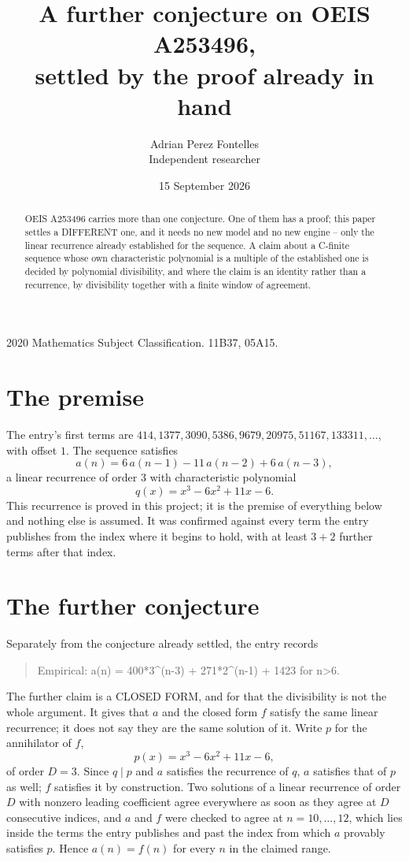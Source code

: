 \documentclass[11pt,a4paper]{article}
\title{A further conjecture on OEIS A253496,\\ \large settled by the proof already in hand}
\author{Adrian Perez Fontelles\\ \small Independent researcher}
\date{15 September 2026}
\theoremstyle{plain}
\theoremstyle{definition}
\begin{document}
\maketitle

\begin{abstract}
OEIS A253496 carries more than one conjecture. One of them has a proof; this paper settles a
DIFFERENT one, and it needs no new model and no new engine -- only the linear recurrence already
established for the sequence. A claim about a C-finite sequence whose own characteristic
polynomial is a multiple of the established one is decided by polynomial divisibility, and where
the claim is an identity rather than a recurrence, by divisibility together with a finite window
of agreement.
\end{abstract}

\noindent\small 2020 Mathematics Subject Classification. 11B37, 05A15.\normalsize

\section{The premise}

The entry's first terms are $414, 1377, 3090, 5386, 9679, 20975, 51167, 133311,\dots$, with offset $1$. The sequence satisfies
\[
  a(n)=6\,a(n-1) - 11\,a(n-2) + 6\,a(n-3) ,
\]
a linear recurrence of order $3$ with characteristic polynomial
\[
  q(x)=x^{3} - 6 x^{2} + 11 x - 6 .
\]
This recurrence is proved in this project; it is the premise of everything below and nothing else is assumed.
It was confirmed against every term the entry publishes from the index where it begins to hold,
with at least $3+2$ further terms after that index.

\section{The further conjecture}

Separately from the conjecture already settled, the entry records

\begin{quote}\raggedright Empirical: a(n) = 400*3\^{}(n-3) + 271*2\^{}(n-1) + 1423 for n>6.\end{quote}

The further claim is a CLOSED FORM, and for that the divisibility is not the whole argument. It
gives that $a$ and the closed form $f$ satisfy the same linear recurrence; it does not say they
are the same solution of it. Write $p$ for the annihilator of $f$,
\[
  p(x)=x^{3} - 6 x^{2} + 11 x - 6 ,
\]
of order $D=3$. Since $q\mid p$ and $a$ satisfies the recurrence of $q$, $a$ satisfies that of
$p$ as well; $f$ satisfies it by construction. Two solutions of a linear recurrence of order $D$
with nonzero leading coefficient agree everywhere as soon as they agree at $D$ consecutive
indices, and $a$ and $f$ were checked to agree at $n=10,\dots,12$,
which lies inside the terms the entry publishes and past the index from which $a$ provably
satisfies $p$. Hence $a(n)=f(n)$ for every $n$ in the claimed range.
\end{document}
